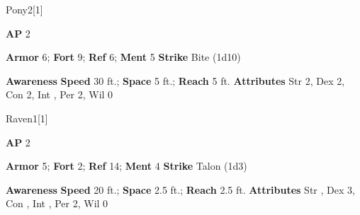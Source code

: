 \begin{monsection}{Pony}{2}[1]
\vspace{-1em}\vspace{-1em}
\begin{spellcontent}
\begin{spelltargetinginfo}
{\textbf{AP} 2}

\pari \textbf{Armor} 6;
\textbf{Fort} 9;
\textbf{Ref} 6;
\textbf{Ment} 5
\pari \textbf{Strike} Bite  (1d10)



\end{spelltargetinginfo}


\end{spellcontent}

\begin{monsterfooter}
\pari \textbf{Awareness} 
\pari \textbf{Speed} 30 ft.;
\textbf{Space} 5 ft.;
\textbf{Reach} 5 ft.
\pari \textbf{Attributes}
Str 2,
Dex 2,
Con 2,
Int ,
Per 2,
Wil 0
\end{monsterfooter}
\end{monsection}



\begin{monsection}{Raven}{1}[1]
\vspace{-1em}\vspace{-1em}
\begin{spellcontent}
\begin{spelltargetinginfo}
{\textbf{AP} 2}

\pari \textbf{Armor} 5;
\textbf{Fort} 2;
\textbf{Ref} 14;
\textbf{Ment} 4
\pari \textbf{Strike} Talon  (1d3)



\end{spelltargetinginfo}


\end{spellcontent}

\begin{monsterfooter}
\pari \textbf{Awareness} 
\pari \textbf{Speed} 20 ft.;
\textbf{Space} 2.5 ft.;
\textbf{Reach} 2.5 ft.
\pari \textbf{Attributes}
Str ,
Dex 3,
Con ,
Int ,
Per 2,
Wil 0
\end{monsterfooter}
\end{monsection}



